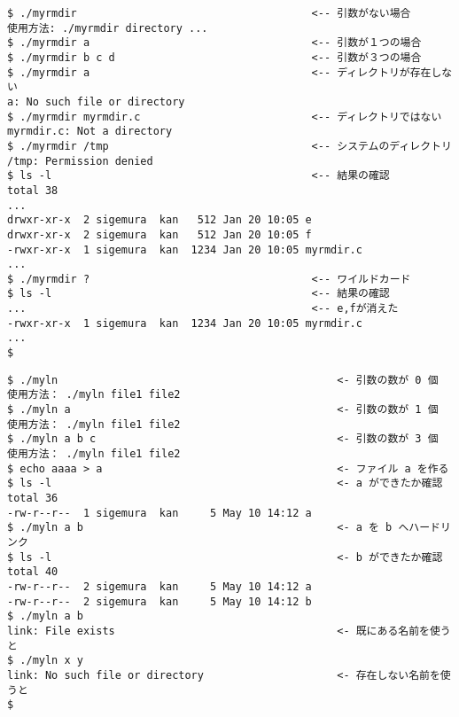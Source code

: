 \documentclass[a4j,twcolumn,11pt,nomag]{ltjarticle}      %
\begin{document}
\begin{enumerate}
\begin{lstlisting}[caption=myrmdirの実行例（動作テスト！！）]
$ ./myrmdir                                     <-- 引数がない場合
使用方法: ./myrmdir directory ...
$ ./myrmdir a                                   <-- 引数が１つの場合
$ ./myrmdir b c d                               <-- 引数が３つの場合
$ ./myrmdir a                                   <-- ディレクトリが存在しない
a: No such file or directory
$ ./myrmdir myrmdir.c                           <-- ディレクトリではない
myrmdir.c: Not a directory
$ ./myrmdir /tmp                                <-- システムのディレクトリ
/tmp: Permission denied
$ ls -l                                         <-- 結果の確認
total 38
...
drwxr-xr-x  2 sigemura  kan   512 Jan 20 10:05 e
drwxr-xr-x  2 sigemura  kan   512 Jan 20 10:05 f
-rwxr-xr-x  1 sigemura  kan  1234 Jan 20 10:05 myrmdir.c
...
$ ./myrmdir ?                                   <-- ワイルドカード
$ ls -l                                         <-- 結果の確認
...                                             <-- e,fが消えた
-rwxr-xr-x  1 sigemura  kan  1234 Jan 20 10:05 myrmdir.c
...
$
\end{lstlisting}

\begin{lstlisting}[caption=mylnの実行例（動作テスト！！）]
$ ./myln                                            <- 引数の数が 0 個
使用方法： ./myln file1 file2
$ ./myln a                                          <- 引数の数が 1 個
使用方法： ./myln file1 file2
$ ./myln a b c                                      <- 引数の数が 3 個
使用方法： ./myln file1 file2
$ echo aaaa > a                                     <- ファイル a を作る
$ ls -l                                             <- a ができたか確認
total 36
-rw-r--r--  1 sigemura  kan     5 May 10 14:12 a
$ ./myln a b                                        <- a を b へハードリンク
$ ls -l                                             <- b ができたか確認
total 40
-rw-r--r--  2 sigemura  kan     5 May 10 14:12 a
-rw-r--r--  2 sigemura  kan     5 May 10 14:12 b
$ ./myln a b
link: File exists                                   <- 既にある名前を使うと
$ ./myln x y
link: No such file or directory                     <- 存在しない名前を使うと
$
\end{lstlisting}
\newpage



\end{enumerate}
\end{document}
